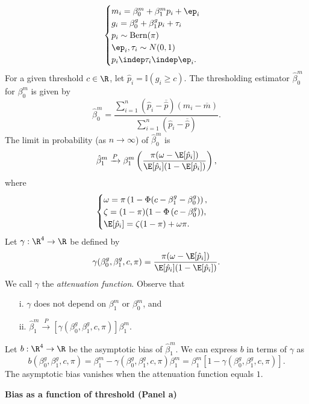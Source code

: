 \documentclass[12pt]{article}
\begin{document}
\begin{equation}\label{theoretical_model}
\begin{cases}
m_i = \beta^m_0 + \beta^m_1 p_i + \ep_i \\
g_i = \beta^g_0 + \beta^g_1 p_i + \tau_i \\
p_i \sim \textrm{Bern}(\pi) \\
\ep_i, \tau_i \sim N(0,1) \\
p_i \indep \tau_i \indep \ep_i.
\end{cases}
\end{equation}
For a given threshold $c \in \R$, let $\hat{p}_i = \mathbb{I}(g_i \geq c).$ The thresholding estimator $\hat{\beta}^m_0$ for $\beta^m_0$ is given by $$\hat{\beta}^m_0 = \frac{\sum_{i=1}^n (\hat{p}_i - \overline{\hat{p}}) (m_i - \overline{m})}{\sum_{i=1}^n (\hat{p}_i - \overline{\hat{p}})}.$$ The limit in probability (as $n \to \infty$) of $\hat{\beta}^m_0$ is
$$\hat{\beta}^m_1 \xrightarrow{P} \beta^m_1 \left(\frac{ \pi( \omega - \E[ \hat{p}_i ])}{ \E[\hat{p}_i] (1 - \E[\hat{p}_i])}\right),$$ where
$$\begin{cases}
\omega = \pi\left( 1 - \Phi(c - \beta_1^g - \beta_0^g) \right),\\ \zeta = (1-\pi)(1 - \Phi\left( c - \beta^g_0 \right)), \\ \E[\hat{p}_i] = \zeta(1-\pi) + \omega\pi. 
\end{cases}$$
Let $\gamma: \R^4 \to \R$ be defined by
$$ \gamma( \beta^g_0, \beta^g_1, c, \pi ) = \frac{\pi (\omega - \E[\hat{p}_i])}{\E[\hat{p}_i] (1 - \E[\hat{p}_i]) }.$$ We call $\gamma$ the \textit{attenuation function}. Observe that \begin{itemize}
\item[i.] $\gamma$ does not depend on $\beta^m_1$ or $\beta^m_0$, and
\item[ii.] $\hat{\beta}^m_1 \xrightarrow{P} [\gamma(\beta_0^g, \beta_1^g, c, \pi)] \beta^m_1.$
\end{itemize}
Let $b: \R^4 \to \R$ be the asymptotic bias of $\hat{\beta}^m_1$. We can express $b$ in terms of $\gamma$ as $$b\left(\beta^g_0, \beta^g_1, c, \pi \right) = \beta^m_1 - \gamma( \beta_0^g, \beta_1^g, c, \pi) \beta^m_1 = \beta^m_1 \left[ 1- \gamma(\beta^g_0, \beta^g_1, c, \pi) \right].$$ The asymptotic bias vanishes when the attenuation function equals $1$.

\begin{center}
\textbf{Bias as a function of threshold (Panel a)}
\end{center}
\end{document}
